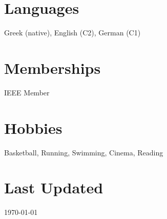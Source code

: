 \documentclass[margin]{res}
\begin{document}
\begin{resume}
\section{Languages} Greek (native), English (C2), German (C1)

\section{Memberships} IEEE Member

\begin{comment}
\section{References \\ available \\ upon request}

\end{comment}

\section{Hobbies}
Basketball, Running, Swimming, Cinema, Reading

\section{Last Updated} \today


\end{resume}
\(\)
\end{document}
